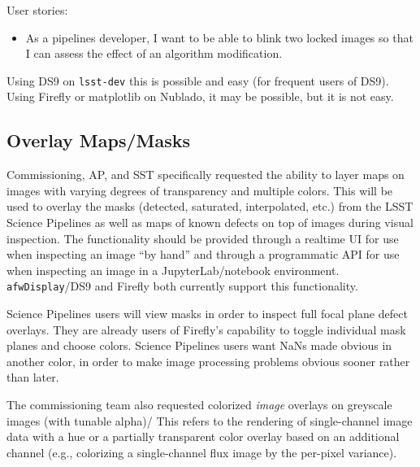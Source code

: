 User stories:
\begin{itemize}
\item{As a pipelines developer,  I want to be able to blink two locked images so that I can assess the effect of an algorithm modification.}
\end{itemize}

Using DS9 on \texttt{lsst-dev} this is possible and easy (for frequent users of DS9).
Using Firefly or matplotlib on Nublado, it may be possible, but it is not easy.

\subsection{Overlay Maps/Masks}
\label{sec:features:masks}

Commissioning, AP, and SST specifically requested the ability to layer maps on
images with varying degrees of transparency and multiple colors.
This will be used to overlay the masks (detected, saturated, interpolated, etc.)
from the LSST Science Pipelines as well as maps of known defects on top of
images during visual inspection.  The functionality should be provided through
a realtime UI for use when inspecting an image ``by hand'' and through a
programmatic API for use when inspecting an image in a JupyterLab/notebook
environment.  \texttt{afwDisplay}/DS9 and Firefly both currently support this
functionality.

Science Pipelines users will view masks in order to inspect full focal plane defect overlays.
They are already users of Firefly's capability to toggle individual mask planes and choose colors.
Science Pipelines users want NaNs made obvious in another color, in order to make image processing problems obvious sooner rather than later.

The commissioning team also requested colorized \emph{image} overlays on greyscale images (with tunable alpha)/
This refers to the rendering of single-channel image data with a hue or a partially transparent color overlay based on an additional channel (e.g., colorizing a single-channel flux image by the per-pixel variance).




